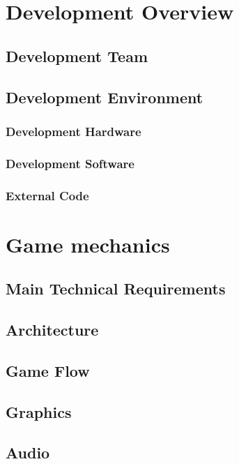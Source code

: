 \documentclass{article}
\begin{document}
\section{Development Overview}

\subsection{Development Team}

\subsection{Development Environment}

\subsubsection{Development Hardware}

\subsubsection{Development Software}

\subsubsection{External Code}

\section{Game mechanics}

\subsection{Main Technical Requirements}

\subsection{Architecture}

\subsection{Game Flow}

\subsection{Graphics}

\subsection{Audio}
\end{document}
